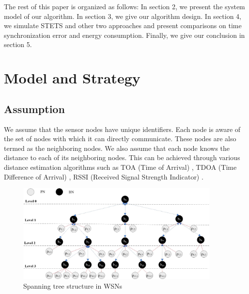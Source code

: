 \documentclass[runningheads,a4paper]{llncs}
\begin{document}
The rest of this paper is organized as follows: In section 2, we present the system model of our algorithm. In section 3, we give our algorithm design. In section 4, we simulate STETS and other two approaches and present comparisons on time synchronization error and energy consumption. Finally, we give our conclusion in section 5.

\section{Model and Strategy}
\subsection{Assumption}
We assume that the sensor nodes have unique identifiers. Each node is aware of the set of nodes with which it can directly communicate. These nodes are also termed as the neighboring nodes. We also assume that each node knows the distance to each of its neighboring nodes. This can be achieved through various distance estimation algorithms such as TOA (Time of Arrival) \cite{8}, TDOA (Time Difference of Arrival) \cite{9}, RSSI (Received Signal Strength Indicator) \cite{10}.

\begin{figure}[h]
\centering
\includegraphics[width=4.0in]{fig1.jpg}
\caption{Spanning tree structure in WSNs}
\label{fig_sim}
\end{figure}
\end{document}
